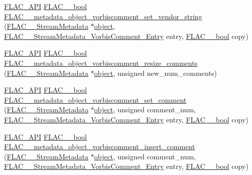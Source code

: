 \begin{DoxyCompactItemize}
\item 
\mbox{\hyperlink{group__flac__export_ga56ca07df8a23310707732b1c0007d6f5}{F\+L\+A\+C\+\_\+\+A\+PI}} \mbox{\hyperlink{ordinals_8h_a95103469f1cbd78b8cf250194985b34e}{F\+L\+A\+C\+\_\+\+\_\+bool}} \mbox{\hyperlink{group__flac__metadata__object_gabfc6277c08a86329efd19572695b57e6}{F\+L\+A\+C\+\_\+\+\_\+metadata\+\_\+object\+\_\+vorbiscomment\+\_\+set\+\_\+vendor\+\_\+string}} (\mbox{\hyperlink{struct_f_l_a_c_____stream_metadata}{F\+L\+A\+C\+\_\+\+\_\+\+Stream\+Metadata}} $\ast$\mbox{\hyperlink{_s_d_l__opengl__glext_8h_ab49790263c78300fbf05719e38246198}{object}}, \mbox{\hyperlink{struct_f_l_a_c_____stream_metadata___vorbis_comment___entry}{F\+L\+A\+C\+\_\+\+\_\+\+Stream\+Metadata\+\_\+\+Vorbis\+Comment\+\_\+\+Entry}} entry, \mbox{\hyperlink{ordinals_8h_a95103469f1cbd78b8cf250194985b34e}{F\+L\+A\+C\+\_\+\+\_\+bool}} copy)
\item 
\mbox{\hyperlink{group__flac__export_ga56ca07df8a23310707732b1c0007d6f5}{F\+L\+A\+C\+\_\+\+A\+PI}} \mbox{\hyperlink{ordinals_8h_a95103469f1cbd78b8cf250194985b34e}{F\+L\+A\+C\+\_\+\+\_\+bool}} \mbox{\hyperlink{group__flac__metadata__object_ga264611f0af9b5e09d083c1ca5495f1c4}{F\+L\+A\+C\+\_\+\+\_\+metadata\+\_\+object\+\_\+vorbiscomment\+\_\+resize\+\_\+comments}} (\mbox{\hyperlink{struct_f_l_a_c_____stream_metadata}{F\+L\+A\+C\+\_\+\+\_\+\+Stream\+Metadata}} $\ast$\mbox{\hyperlink{_s_d_l__opengl__glext_8h_ab49790263c78300fbf05719e38246198}{object}}, unsigned new\+\_\+num\+\_\+comments)
\item 
\mbox{\hyperlink{group__flac__export_ga56ca07df8a23310707732b1c0007d6f5}{F\+L\+A\+C\+\_\+\+A\+PI}} \mbox{\hyperlink{ordinals_8h_a95103469f1cbd78b8cf250194985b34e}{F\+L\+A\+C\+\_\+\+\_\+bool}} \mbox{\hyperlink{group__flac__metadata__object_gadf034b2c385e7932c6be2d724a0deae3}{F\+L\+A\+C\+\_\+\+\_\+metadata\+\_\+object\+\_\+vorbiscomment\+\_\+set\+\_\+comment}} (\mbox{\hyperlink{struct_f_l_a_c_____stream_metadata}{F\+L\+A\+C\+\_\+\+\_\+\+Stream\+Metadata}} $\ast$\mbox{\hyperlink{_s_d_l__opengl__glext_8h_ab49790263c78300fbf05719e38246198}{object}}, unsigned comment\+\_\+num, \mbox{\hyperlink{struct_f_l_a_c_____stream_metadata___vorbis_comment___entry}{F\+L\+A\+C\+\_\+\+\_\+\+Stream\+Metadata\+\_\+\+Vorbis\+Comment\+\_\+\+Entry}} entry, \mbox{\hyperlink{ordinals_8h_a95103469f1cbd78b8cf250194985b34e}{F\+L\+A\+C\+\_\+\+\_\+bool}} copy)
\item 
\mbox{\hyperlink{group__flac__export_ga56ca07df8a23310707732b1c0007d6f5}{F\+L\+A\+C\+\_\+\+A\+PI}} \mbox{\hyperlink{ordinals_8h_a95103469f1cbd78b8cf250194985b34e}{F\+L\+A\+C\+\_\+\+\_\+bool}} \mbox{\hyperlink{group__flac__metadata__object_ga0c23f59f465f302b35a2d3ab1eae07e7}{F\+L\+A\+C\+\_\+\+\_\+metadata\+\_\+object\+\_\+vorbiscomment\+\_\+insert\+\_\+comment}} (\mbox{\hyperlink{struct_f_l_a_c_____stream_metadata}{F\+L\+A\+C\+\_\+\+\_\+\+Stream\+Metadata}} $\ast$\mbox{\hyperlink{_s_d_l__opengl__glext_8h_ab49790263c78300fbf05719e38246198}{object}}, unsigned comment\+\_\+num, \mbox{\hyperlink{struct_f_l_a_c_____stream_metadata___vorbis_comment___entry}{F\+L\+A\+C\+\_\+\+\_\+\+Stream\+Metadata\+\_\+\+Vorbis\+Comment\+\_\+\+Entry}} entry, \mbox{\hyperlink{ordinals_8h_a95103469f1cbd78b8cf250194985b34e}{F\+L\+A\+C\+\_\+\+\_\+bool}} copy)

\end{DoxyCompactItemize}
